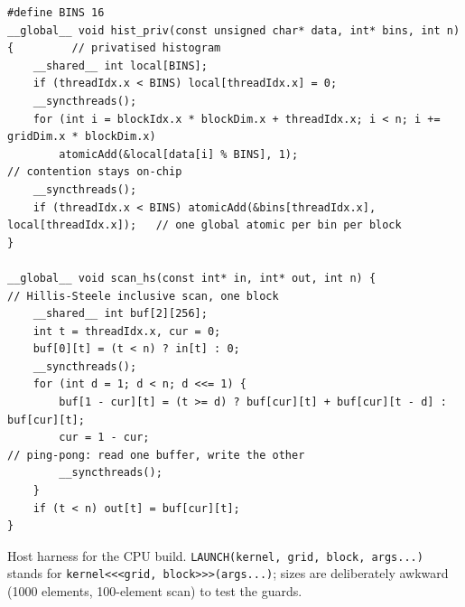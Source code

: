 \documentclass[10pt,a4paper,openany,oneside]{report}
\begin{document}
\begin{lstlisting}[language={CUDA},basicstyle=\ttfamily\scriptsize,title={k15.cu: the kernels}]
#define BINS 16
__global__ void hist_priv(const unsigned char* data, int* bins, int n) {         // privatised histogram
    __shared__ int local[BINS];
    if (threadIdx.x < BINS) local[threadIdx.x] = 0;
    __syncthreads();
    for (int i = blockIdx.x * blockDim.x + threadIdx.x; i < n; i += gridDim.x * blockDim.x)
        atomicAdd(&local[data[i] % BINS], 1);                                    // contention stays on-chip
    __syncthreads();
    if (threadIdx.x < BINS) atomicAdd(&bins[threadIdx.x], local[threadIdx.x]);   // one global atomic per bin per block
}

__global__ void scan_hs(const int* in, int* out, int n) {                        // Hillis-Steele inclusive scan, one block
    __shared__ int buf[2][256];
    int t = threadIdx.x, cur = 0;
    buf[0][t] = (t < n) ? in[t] : 0;
    __syncthreads();
    for (int d = 1; d < n; d <<= 1) {
        buf[1 - cur][t] = (t >= d) ? buf[cur][t] + buf[cur][t - d] : buf[cur][t];
        cur = 1 - cur;                                                           // ping-pong: read one buffer, write the other
        __syncthreads();
    }
    if (t < n) out[t] = buf[cur][t];
}
\end{lstlisting}

Host harness for the CPU build. \texttt{LAUNCH(kernel, grid, block, args...)} stands for \texttt{kernel<<<grid, block>>>(args...)}; sizes are deliberately awkward (1000 elements, 100-element scan) to test the guards.
\end{document}
